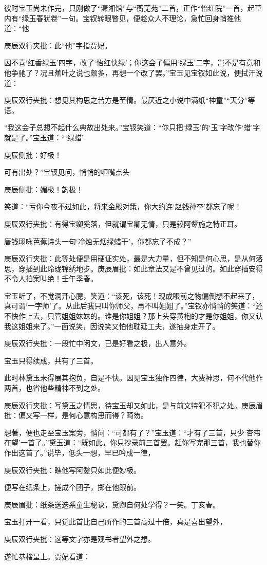 \begin{parag}
    彼时宝玉尚未作完，只刚做了“潇湘馆”与“蘅芜苑”二首，正作“怡红院”一首，起草内有“绿玉春犹卷”一句。宝钗转眼瞥见，便趁众人不理论，急忙回身悄推他道：“他\begin{note}庚辰双行夹批：此“他”字指贾妃。\end{note}因不喜‘红香绿玉’四字，改了‘怡红快绿’；你这会子偏用‘绿玉’二字，岂不是有意和他争驰了？况且蕉叶之说也颇多，再想一个改了罢。”宝玉见宝钗如此说，便拭汗说道：\begin{note}庚辰双行夹批：想见其构思之苦方是至情。最厌近之小说中满纸“神童”“天分”等语。\end{note}“我这会子总想不起什么典故出处来。”宝钗笑道：“你只把‘绿玉’的‘玉’字改作‘蜡’字就是了。”宝玉道：“‘绿蜡’\begin{note}庚辰侧批：好极！\end{note}可有出处？”宝钗见问，悄悄的咂嘴点头\begin{note}庚辰侧批：媚极！韵极！\end{note}笑道：“亏你今夜不过如此，将来金殿对策，你大约连‘赵钱孙李’都忘了呢！\begin{note}庚辰双行夹批：有得宝卿奚落，但就谓宝卿无情，只是较阿颦施之特正耳。\end{note}唐钱珝咏芭蕉诗头一句‘冷烛无烟绿蜡干’，你都忘了不成？”\begin{note}庚辰双行夹批：此等处便是用硬证实处，最是大力量，但不知是何心思，是从何落思，穿插到此玲珑锦绣地步。庚辰眉批：如此章法又是不曾见过的。如此穿插安得不令人拍案叫绝！壬午季春。\end{note}宝玉听了，不觉洞开心臆，笑道：“该死，该死！现成眼前之物偏倒想不起来了，真可谓‘一字师’了。从此后我只叫你师父，再不叫姐姐了。”宝钗亦悄悄的笑道：“还不快作上去，只管姐姐妹妹的。谁是你姐姐？那上头穿黄袍的才是你姐姐，你又认我这姐姐来了。”一面说笑，因说笑又怕他耽延工夫，遂抽身走开了。\begin{note}庚辰双行夹批：一段忙中闲文，已是好看之极，出人意外。\end{note}宝玉只得续成，共有了三首。
\end{parag}


\begin{parag}
    此时林黛玉未得展其抱负，自是不快。因见宝玉独作四律，大费神思，何不代他作两首，也省他些精神不到之处。\begin{note}庚辰双行夹批：写黛玉之情思，待宝玉却又如此，是与前文特犯不犯之处。庚辰眉批：偏又写一样，是何心意构思而得？畸笏。\end{note}想著，便也走至宝玉案旁，悄问：“可都有了？”宝玉道：“才有了三首，只少‘杏帘在望’一首了。”黛玉道：“既如此，你只抄录前三首罢。赶你写完那三首，我也替你作出这首了。”说毕，低头一想，早已吟成一律，\begin{note}庚辰双行夹批：瞧他写阿颦只如此便妙极。\end{note}便写在纸条上，搓成个团子，掷在他跟前。\begin{note}庚辰眉批：纸条送迭系童生秘诀，黛卿自何处学得？一笑。丁亥春。\end{note}宝玉打开一看，只觉此首比自己所作的三首高过十倍，真是喜出望外，\begin{note}庚辰双行夹批：这等文字亦是观书者望外之想。\end{note}遂忙恭楷呈上。贾妃看道：
\end{parag}



